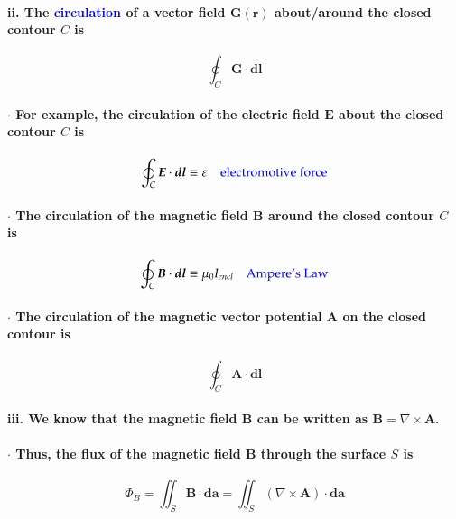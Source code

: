 \documentclass{article}
\begin{document}
\paragraph{\indent \indent ii. The \textcolor{blue}{circulation} of a vector field $\boldsymbol{G}(\boldsymbol{r})$ about/around the closed contour $C$ is }
\begin{equation*}
    \oint_C\boldsymbol{G}\cdot\boldsymbol{dl}
\end{equation*}
\paragraph{\indent $\cdot$ For example, the circulation of the electric field $\boldsymbol{E}$ about the closed contour $C$ is }
\begin{equation*}
    \oint_C\boldsymbol{E}\cdot\boldsymbol{dl} \equiv \varepsilon \quad \text{\textcolor{blue}{electromotive force}}
\end{equation*}
\paragraph{\indent $\cdot$ The circulation of the magnetic field $\boldsymbol{B}$ around the closed contour $C$ is }
\begin{equation*}
    \oint_C\boldsymbol{B}\cdot\boldsymbol{dl} \equiv \mu_0I_{encl}\quad \text{\textcolor{blue}{Ampere's Law}}
\end{equation*}
\paragraph{\indent $\cdot$ The circulation of the magnetic vector potential $\boldsymbol{A}$ on the closed contour is}
\begin{equation*}
    \oint_C\boldsymbol{A}\cdot\boldsymbol{dl}
\end{equation*}
\paragraph{\indent\indent iii. We know that the magnetic field $\boldsymbol{B}$ can be written as $\boldsymbol{B}=\nabla\times\boldsymbol{A}$.}
\paragraph{\indent $\cdot$ Thus, the flux of the magnetic field $\boldsymbol{B}$ through the surface $S$ is}
\begin{equation*}
    \Phi_B=\iint_S\boldsymbol{B}\cdot\boldsymbol{da}=\iint_S(\nabla\times\boldsymbol{A})\cdot\boldsymbol{da}
\end{equation*}
\end{document}
